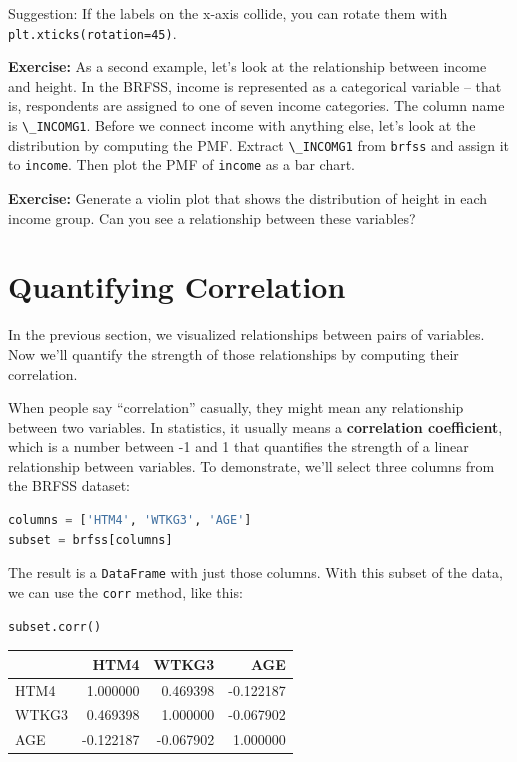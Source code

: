 \documentclass[
]{book}
\newcommand{\passthrough}[1]{#1}
\begin{document}
Suggestion: If the labels on the x-axis collide, you can rotate them
with \passthrough{\lstinline!plt.xticks(rotation=45)!}.

\textbf{Exercise:} As a second example, let's look at the relationship
between income and height. In the BRFSS, income is represented as a
categorical variable -- that is, respondents are assigned to one of
seven income categories. The column name is
\passthrough{\lstinline!\_INCOMG1!}. Before we connect income with
anything else, let's look at the distribution by computing the PMF.
Extract \passthrough{\lstinline!\_INCOMG1!} from
\passthrough{\lstinline!brfss!} and assign it to
\passthrough{\lstinline!income!}. Then plot the PMF of
\passthrough{\lstinline!income!} as a bar chart.

\textbf{Exercise:} Generate a violin plot that shows the distribution of
height in each income group. Can you see a relationship between these
variables?

\section{Quantifying Correlation}\label{quantifying-correlation}

In the previous section, we visualized relationships between pairs of
variables. Now we'll quantify the strength of those relationships by
computing their correlation.

When people say ``correlation'' casually, they might mean any
relationship between two variables. In statistics, it usually means a
\textbf{correlation coefficient}, which is a number between -1 and 1
that quantifies the strength of a linear relationship between variables.
To demonstrate, we'll select three columns from the BRFSS dataset:

\begin{lstlisting}[language=Python]
columns = ['HTM4', 'WTKG3', 'AGE']
subset = brfss[columns]
\end{lstlisting}

The result is a \passthrough{\lstinline!DataFrame!} with just those
columns. With this subset of the data, we can use the
\passthrough{\lstinline!corr!} method, like this:

\begin{lstlisting}[language=Python]
subset.corr()
\end{lstlisting}

\begin{tabular}{lrrr}
\toprule
 & HTM4 & WTKG3 & AGE \\
\midrule
HTM4 & 1.000000 & 0.469398 & -0.122187 \\
WTKG3 & 0.469398 & 1.000000 & -0.067902 \\
AGE & -0.122187 & -0.067902 & 1.000000 \\
\bottomrule
\end{tabular}
\end{document}
